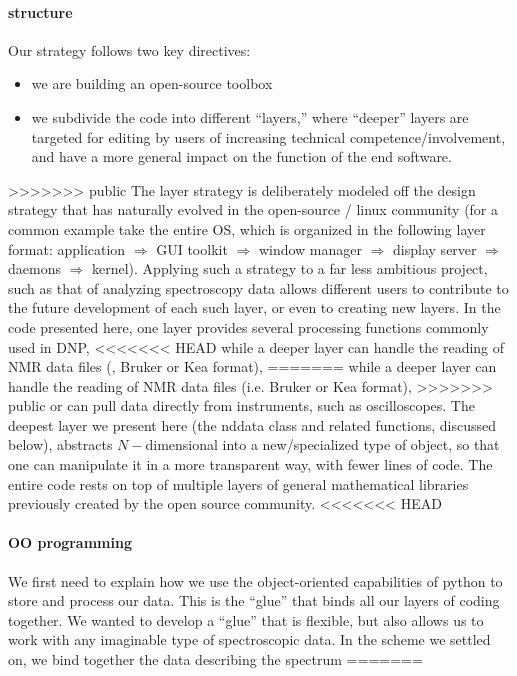 \paragraph{structure}
Our strategy follows two key directives:
\begin{itemize}
    \item we are building an open-source toolbox
    \item we subdivide the code into different ``layers,'' where ``deeper'' layers are targeted for editing by users of increasing technical competence/involvement, and have a more general impact on the function of the end software.
\end{itemize}
>>>>>>> public
The layer strategy is deliberately modeled off the
    design strategy that has naturally evolved
    in the open-source / linux community
    (for a common example
    take the entire OS, which is organized in the following layer format:
    application $\Rightarrow$ GUI toolkit $\Rightarrow$ window manager $\Rightarrow$ display server $\Rightarrow$ daemons $\Rightarrow$ kernel).
Applying such a strategy to a far less ambitious
    project, such as that of analyzing spectroscopy data
    allows different users to contribute to the future development
    of each such layer, or even to creating new layers.
In the code presented here,
    one layer provides several processing functions commonly used in DNP,
<<<<<<< HEAD
    while a deeper layer can handle the reading of NMR data files (\ie, Bruker or Kea format),
=======
    while a deeper layer can handle the reading of NMR data files (i.e. Bruker or Kea format),
>>>>>>> public
    or can pull data directly from instruments,
    such as oscilloscopes.
The deepest layer we present 
    here (the nddata class and related functions,
    discussed below),
    abstracts $N-$dimensional into 
    a new/specialized type of object,
    so that one can manipulate it in a more
    transparent way, with fewer lines of code.
The entire code rests on top of multiple layers
    of general mathematical libraries previously created by the open
    source community.
<<<<<<< HEAD
\paragraph{OO programming}
We first need to explain 
    how we use the object-oriented capabilities of python
    to store and process our data.
This is the ``glue'' that binds all our layers of coding together.
We wanted to develop a ``glue'' that is flexible,
    but also allows us to work with any imaginable type
    of spectroscopic data.
In the scheme we settled on,
    we bind together the data describing the spectrum
=======

